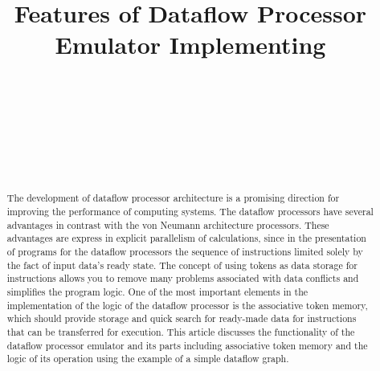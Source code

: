\documentclass[
11pt,%
tightenlines,%
twoside,%
onecolumn,%
nofloats,%
nobibnotes,%
nofootinbib,%
superscriptaddress,%
noshowpacs,%
centertags]%
{revtex4}
\begin{document}

\title{Features of Dataflow Processor Emulator Implementing}

\author{~}

\author{~}

\author{~}

\author{~}



\begin{abstract}
The development of dataflow processor architecture is a promising direction for improving the performance of computing systems.
The dataflow processors have several advantages in contrast with the von Neumann architecture processors.
These advantages are express in explicit parallelism of calculations, since in the presentation of programs for the dataflow processors the sequence of instructions limited solely by the fact of input data’s ready state.
The concept of using tokens as data storage for instructions allows you to remove many problems associated with data conflicts and simplifies the program logic.
One of the most important elements in the implementation of the logic of the dataflow processor is the associative token memory, which should provide storage and quick search for ready-made data for instructions that can be transferred for execution.
This article discusses the functionality of the dataflow processor emulator and its parts including associative token memory and the logic of its operation using the example of a simple dataflow graph.
\end{abstract}
\end{document}
